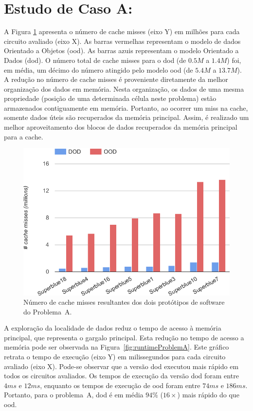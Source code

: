 \section{Estudo de Caso A:}
\label{sec:problema_a}

A Figura \ref{fig:missProblemA} apresenta o número de cache misses (eixo Y) em milhões para cada circuito avaliado (eixo X). As barras vermelhas representam o modelo de dados Orientado a Objetos (\ac{ood}). As barras azuis representam o modelo Orientado a Dados (\ac{dod}). O número total de cache misses para o \ac{dod} (de $0.5M$ a $1.4M$) foi, em média, um décimo do número atingido pelo modelo \ac{ood} (de $5.4M$ a $13.7M$). A redução no número de cache misses é proveniente diretamente da melhor organização dos dados em memória. Nesta organização, os dados de uma mesma propriedade (posição de uma determinada célula neste problema) estão armazenados contiguamente em memória. Portanto, ao ocorrer um miss na cache, somente dados úteis são recuperados da memória principal. Assim, é realizado um melhor aproveitamento dos blocos de dados recuperados da memória principal para a cache.

\begin{figure}[ht]
    \centering
    \includegraphics[width=0.7\linewidth]{img/results/missProblemA}
    \caption[Cache misses do Problema~A.]{Número de cache misses resultantes dos dois protótipos de software do Problema~A.}
    \label{fig:missProblemA}
\end{figure}

A exploração da localidade de dados reduz o tempo de acesso à memória principal, que representa o gargalo principal. Esta redução no tempo de acesso a memória pode ser observada na Figura~\ref{fig:runtimeProblemA}. Este gráfico retrata o tempo de execução (eixo Y) em milissegundos para cada circuito avaliado (eixo X). Pode-se observar que a versão \ac{dod} executou mais rápido em todos os circuitos avaliados. Os tempos de execução da versão \ac{dod} foram entre $4ms$ e $12ms$, enquanto os tempos de execução de \ac{ood} foram entre $74ms$ e $186ms$. Portanto, para o problema~A, \ac{dod} é em média $94\%$ ($16\times$) mais rápido do que \ac{ood}.


